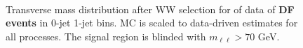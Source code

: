 \begin{figure}[!hbtp]
\centering
{}
 \\
\caption{Transverse mass distribution after WW selection for \intlumiEightTeV of data 
of {\bf DF events} in 0-jet  1-jet  bins.   
MC is scaled to data-driven estimates for all processes.
The signal region is blinded with $m_{\ell\ell}>70$ GeV. }
\label{fig:ww_mt}
\end{figure}

